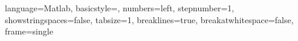 \usepackage[T1]{fontenc}
\usepackage[utf8]{inputenc}
\usepackage{lmodern}
\usepackage{hyperref}
\usepackage{graphicx}
\usepackage[english]{babel}

\usepackage{bm}
\usepackage{amsmath}
\usepackage{amsfonts}

\usepackage{amsthm}
\renewcommand*{\proofname}{Dimostrazione}
\newtheorem{exercise}{Esercizio}
\newtheorem{property}{Proprietà}

\usepackage[ruled,vlined,linesnumbered]{algorithm2e}

\newcommand{\xstar}{x^*}
\newcommand{\bxstar}{\bm{x^*}}
\newcommand{\bx}{\bm{x}}
\newcommand{\Rn}{\mathbb{R}^n}
\newcommand{\RR}{\mathbb{R}}
\newcommand{\norm}[1]{\left\lvert \left\lvert #1 \right\lvert \right\lvert}

\newcommand{\fx}{f(x)}

\newcommand{\gradfx}{\nabla \fx}
\newcommand{\Gx}{\nabla f(x)}
\newcommand{\Gk}{\nabla f(x_k)}
\newcommand{\Gs}{\nabla f(\xstar)}

\newcommand{\Hx}{\nabla^2 f(x)}
\newcommand{\Hk}{\nabla^2 f(x_k)}
\newcommand{\Hs}{\nabla^2 f(\xstar)}
\newcommand{\hess}{\nabla^2 f}

\newcommand{\step}{\alpha}
\newcommand{\Seqx}{\{ x_k \}}

\usepackage{mathtools}
\newcommand\myeq{\stackrel{\mathclap{\normalfont\mbox{def}}}{=}}

\usepackage{listings}
\lstset
{ 
    language=Matlab,
    basicstyle=\normalsize,
    numbers=left,
    stepnumber=1,
    showstringspaces=false,
    tabsize=1,
    breaklines=true,
    breakatwhitespace=false,
   frame=single
}
